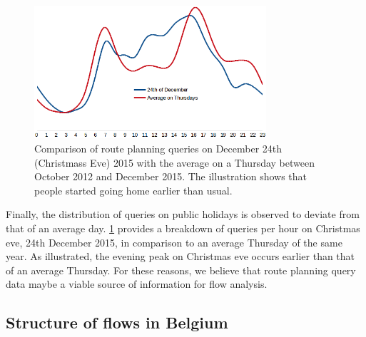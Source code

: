 \documentclass{sig-alternate}
\newcommand{\todo}[1]{\noindent\textcolor{red}{{\bf \{TODO}: #1{\bf \}}}}
\begin{document}
\begin{figure}
\centering
\includegraphics[width=8.6cm]{dec24}
\caption{Comparison of route planning queries on December 24th (Christmass Eve) 2015 with the average on a Thursday between October 2012 and December 2015. The illustration shows that people started going home earlier than usual.}
\label{fig:dec24}
\end{figure}

Finally, the distribution of queries on public holidays is observed to deviate from that of an average day. 
\cref{fig:dec24} provides a breakdown of queries per hour on Christmas eve, 24th December 2015, in comparison to an average Thursday of the same year. 
As illustrated, the evening peak on Christmas eve occurs earlier than that of an average Thursday. 
For these reasons, we believe that route planning query data maybe a viable source of information for flow analysis.%

\subsection{Structure of flows in Belgium}
\end{document}
